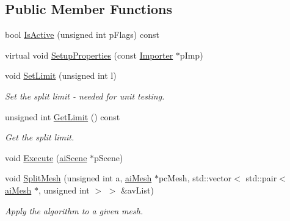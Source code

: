 \subsection*{Public Member Functions}
\begin{DoxyCompactItemize}
\item 
bool \hyperlink{class_assimp_1_1_split_large_meshes_process___vertex_a5a4336dc4ea51d01d608178ff5e7f944}{Is\+Active} (unsigned int p\+Flags) const 
\item 
virtual void \hyperlink{class_assimp_1_1_split_large_meshes_process___vertex_aa6836a25214b54e22265269e2ca45617}{Setup\+Properties} (const \hyperlink{class_assimp_1_1_importer}{Importer} $\ast$p\+Imp)
\item 
\hypertarget{class_assimp_1_1_split_large_meshes_process___vertex_a272f6fe074821efcfb61f1a30758fa1f}{void \hyperlink{class_assimp_1_1_split_large_meshes_process___vertex_a272f6fe074821efcfb61f1a30758fa1f}{Set\+Limit} (unsigned int l)}\label{class_assimp_1_1_split_large_meshes_process___vertex_a272f6fe074821efcfb61f1a30758fa1f}

\begin{DoxyCompactList}\small\item\em Set the split limit -\/ needed for unit testing. \end{DoxyCompactList}\item 
\hypertarget{class_assimp_1_1_split_large_meshes_process___vertex_a4c6080d505781be43201416b3e43ddc3}{unsigned int \hyperlink{class_assimp_1_1_split_large_meshes_process___vertex_a4c6080d505781be43201416b3e43ddc3}{Get\+Limit} () const }\label{class_assimp_1_1_split_large_meshes_process___vertex_a4c6080d505781be43201416b3e43ddc3}

\begin{DoxyCompactList}\small\item\em Get the split limit. \end{DoxyCompactList}\item 
void \hyperlink{class_assimp_1_1_split_large_meshes_process___vertex_ac99bf00815f6ee1091daa732034b0f9e}{Execute} (\hyperlink{structai_scene}{ai\+Scene} $\ast$p\+Scene)
\item 
\hypertarget{class_assimp_1_1_split_large_meshes_process___vertex_a5ebb4c94e6f4269c1d2a893000dca962}{void \hyperlink{class_assimp_1_1_split_large_meshes_process___vertex_a5ebb4c94e6f4269c1d2a893000dca962}{Split\+Mesh} (unsigned int a, \hyperlink{structai_mesh}{ai\+Mesh} $\ast$pc\+Mesh, std\+::vector$<$ std\+::pair$<$ \hyperlink{structai_mesh}{ai\+Mesh} $\ast$, unsigned int $>$ $>$ \&av\+List)}\label{class_assimp_1_1_split_large_meshes_process___vertex_a5ebb4c94e6f4269c1d2a893000dca962}

\begin{DoxyCompactList}\small\item\em Apply the algorithm to a given mesh. \end{DoxyCompactList}\end{DoxyCompactItemize}
